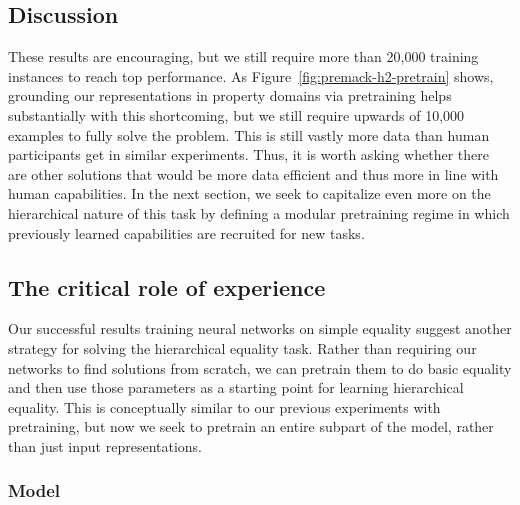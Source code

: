 \documentclass{article}
\newcommand{\figref}[1]{Figure~\ref{#1}}
\newcommand{\update}[1]{{\color{darkblue}#1}}
\begin{document}
\subsection{Discussion}

These results are encouraging, but we still require more than 20,000 training instances to reach top performance. \update{As \figref{fig:premack-h2-pretrain} shows, grounding our representations in property domains via pretraining helps substantially with this shortcoming, but we still require upwards of 10,000 examples to fully solve the problem. This is still vastly more data than human participants get in similar experiments.}  Thus, it is worth asking whether there are other solutions that would be more data efficient and thus more in line with human capabilities.  In the next section, we seek to capitalize even more on the hierarchical nature of this task by defining a modular pretraining regime in which previously learned capabilities are recruited for new tasks.


\subsection{The critical role of experience}\label{sec:modular}

Our successful results training neural networks on simple equality suggest another strategy for solving the hierarchical equality task. Rather than requiring our networks to find solutions from scratch, we can pretrain them to do basic equality and then use those parameters as a starting point for learning hierarchical equality. \update{This is conceptually similar to our previous experiments with pretraining, but now we seek to pretrain an entire subpart of the model, rather than just input representations.}


\subsubsection{Model}
\end{document}
